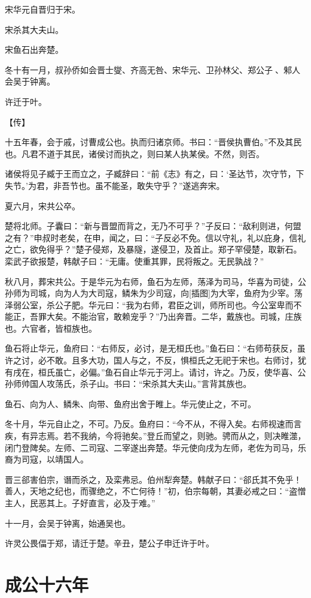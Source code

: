 \documentclass[a4paper,12pt,UTF8,twoside]{ctexbook}
\begin{document}
宋华元自晋归于宋。

宋杀其大夫山。

宋鱼石出奔楚。

冬十有一月，叔孙侨如会晋士燮、齐高无咎、宋华元、卫孙林父、郑公子、邾人会吴于钟离。

许迁于叶。

【传】

十五年春，会于戚，讨曹成公也。执而归诸京师。书曰：“晋侯执曹伯。”不及其民也。凡君不道于其民，诸侯讨而执之，则曰某人执某侯。不然，则否。

诸侯将见子臧于王而立之，子臧辞曰：“前《志》有之，曰：‘圣达节，次守节，下失节。’为君，非吾节也。虽不能圣，敢失守乎？”遂逃奔宋。

夏六月，宋共公卒。

楚将北师。子囊曰：“新与晋盟而背之，无乃不可乎？”子反曰：“敌利则进，何盟之有？”申叔时老矣，在申，闻之，曰：“子反必不免。信以守礼，礼以庇身，信礼之亡，欲免得乎？”楚子侵郑，及暴隧，遂侵卫，及首止。郑子罕侵楚，取新石。栾武子欲报楚，韩献子曰：“无庸。使重其罪，民将叛之。无民孰战？”

秋八月，葬宋共公。于是华元为右师，鱼石为左师，荡泽为司马，华喜为司徒，公孙师为司城，向为人为大司寇，鳞朱为少司寇，向[插图]为大宰，鱼府为少宰。荡泽弱公室，杀公子肥。华元曰：“我为右师，君臣之训，师所司也。今公室卑而不能正，吾罪大矣。不能治官，敢赖宠乎？”乃出奔晋。二华，戴族也。司城，庄族也。六官者，皆桓族也。

鱼石将止华元，鱼府曰：“右师反，必讨，是无桓氏也。”鱼石曰：“右师苟获反，虽许之讨，必不敢。且多大功，国人与之，不反，惧桓氏之无祀于宋也。右师讨，犹有戌在，桓氏虽亡，必偏。”鱼石自止华元于河上。请讨，许之。乃反，使华喜、公孙师帅国人攻荡氏，杀子山。书曰：“宋杀其大夫山。”言背其族也。

鱼石、向为人、鳞朱、向带、鱼府出舍于睢上。华元使止之，不可。

冬十月，华元自止之，不可。乃反。鱼府曰：“今不从，不得入矣。右师视速而言疾，有异志焉。若不我纳，今将驰矣。”登丘而望之，则驰。骋而从之，则决睢澨，闭门登陴矣。左师、二司寇、二宰遂出奔楚。华元使向戌为左师，老佐为司马，乐裔为司寇，以靖国人。

晋三郤害伯宗，谮而杀之，及栾弗忌。伯州犁奔楚。韩献子曰：“郤氏其不免乎！善人，天地之纪也，而骤绝之，不亡何待！”初，伯宗每朝，其妻必戒之曰：“盗憎主人，民恶其上。子好直言，必及于难。”

十一月，会吴于钟离，始通吴也。

许灵公畏偪于郑，请迁于楚。辛丑，楚公子申迁许于叶。

\chapter{成公十六年}
\end{document}
